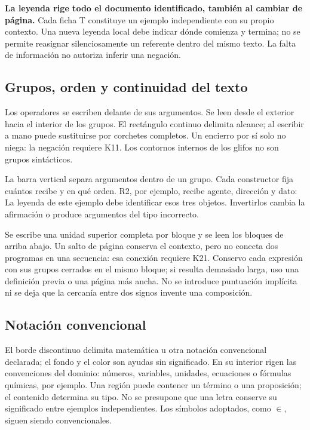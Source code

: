 \textbf{La leyenda rige todo el documento identificado, también al cambiar de
página.} Cada ficha T constituye un ejemplo independiente con su propio contexto.
Una nueva leyenda local debe indicar dónde comienza y termina; no se permite
reasignar silenciosamente un referente dentro del mismo texto. La falta de
información no autoriza inferir una negación.

\subsection{Grupos, orden y continuidad del texto}
Los operadores se escriben delante de sus argumentos. Se leen desde el exterior
hacia el interior de los grupos. El rectángulo continuo delimita alcance; al
escribir a mano puede sustituirse por corchetes completos. Un encierro por sí
solo no niega: la negación requiere K11. Los contornos internos de los glifos
no son grupos sintácticos.

La barra vertical separa argumentos dentro de un grupo. Cada constructor fija
cuántos recibe y en qué orden. R2, por ejemplo, recibe agente, dirección y dato:
La leyenda de este ejemplo debe identificar esos tres objetos. Invertirlos
cambia la afirmación o produce argumentos del tipo incorrecto.

Se escribe una unidad superior completa por bloque y se leen los bloques de
arriba abajo. Un salto de página conserva el contexto, pero no conecta dos
programas en una secuencia: esa conexión requiere K21. Conservo cada expresión
con sus grupos cerrados en el mismo bloque; si resulta demasiado larga, uso una
definición previa o una página más ancha. No se introduce puntuación implícita
ni se deja que la cercanía entre dos signos invente una composición.

\subsection{Notación convencional}
El borde discontinuo delimita matemática u otra notación convencional declarada;
el fondo y el color son ayudas sin significado. En su interior rigen las
convenciones del dominio: números, variables, unidades, ecuaciones o fórmulas
químicas, por ejemplo. Una región puede contener un término o una proposición;
el contenido determina su tipo. No se presupone que una letra conserve su
significado entre ejemplos independientes. Los símbolos adoptados, como
\(\in\), siguen siendo convencionales.

